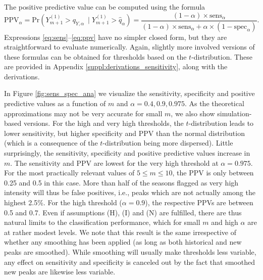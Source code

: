 \documentclass[12pt]{article}
\begin{document}
The positive predictive value can be computed using the formula \citep{Altman1994}
\begin{equation}
\text{PPV}_\alpha = \text{Pr}(Y_{m + 1}^{(1)} > q_{Y, \alpha} \ \mid Y_{m + 1}^{(1)} > \hat{q}_\alpha) = \frac{(1 - \alpha) \times \text{sens}_\alpha}{(1 - \alpha) \times \text{sens}_\alpha + \alpha \times (1 - \text{spec}_\alpha)}.
\label{eq:ppv}
\end{equation}
Expressions \eqref{eq:sens}--\eqref{eq:ppv} have no simpler closed form, but they are straightforward to evaluate numerically. Again, slightly more involved versions of these formulas can be obtained for thresholds based on the $t$-distribution. These are provided in Appendix \ref{suppl:derivations_sensitivity}, along with the derivations.

In Figure \ref{fig:sens_spec_ana} we visualize the sensitivity, specificity and positive predictive values as a function of $m$ and $\alpha = 0.4, 0.9, 0.975 $. As the theoretical approximations may not be very accurate for small $m$, we also show simulation-based versions. For the high and very high thresholds, the $t$-distribution leads to lower sensitivity, but higher specificity and PPV than the normal distribution (which is a consequence of the $t$-distribution being more dispersed). Little surprisingly, the sensitivity, specificity and positive predictive values increase in $m$. The sensitivity and PPV are lowest for the very high threshold at $\alpha = 0.975$. For the most practically relevant values of $5 \leq m \leq 10$, the PPV is only between 0.25 and 0.5 in this case. More than half of the seasons flagged as very high intensity will thus be false positives, i.e., peaks which are not actually among the highest 2.5\%. For the high threshold ($\alpha = 0.9$), the respective PPVs are between 0.5 and 0.7. Even if assumptions (H), (I) and (N) are fulfilled, there are thus natural limits to the classification performance, which for small $m$ and high $\alpha$ are at rather modest levels. We note that this result is the same irrespective of whether any smoothing has been applied (as long as both historical and new peaks are smoothed). While smoothing will usually make thresholds less variable, any effect on sensitivity and specificity is canceled out by the fact that smoothed new peaks are likewise less variable.
\end{document}
